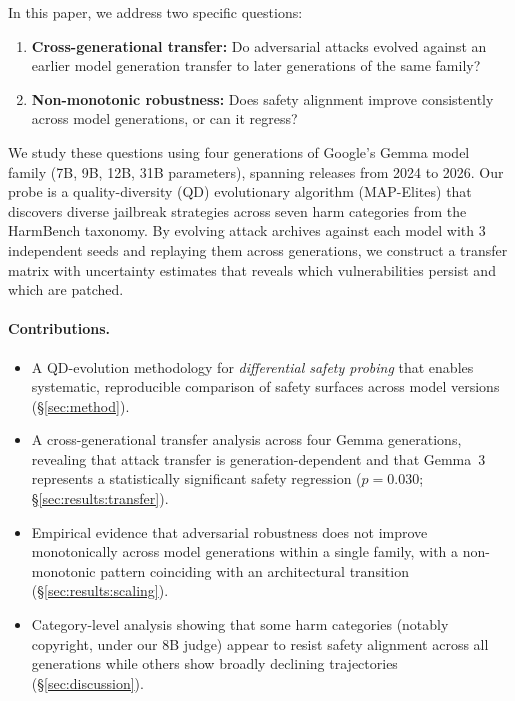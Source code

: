 \documentclass{article}
\begin{document}
In this paper, we address two specific questions:
\begin{enumerate}
    \item \textbf{Cross-generational transfer:} Do adversarial attacks
          evolved against an earlier model generation transfer to later
          generations of the same family?
    \item \textbf{Non-monotonic robustness:} Does safety alignment
          improve consistently across model generations, or can it
          regress?
\end{enumerate}

We study these questions using four generations of Google's Gemma model
family (7B, 9B, 12B, 31B parameters), spanning releases from 2024 to 2026.
Our probe is a quality-diversity (QD) evolutionary algorithm (MAP-Elites)
that discovers diverse jailbreak strategies across seven harm categories
from the HarmBench taxonomy. By evolving attack archives against each model
with 3 independent seeds and replaying them across generations, we
construct a transfer matrix with uncertainty estimates that reveals which
vulnerabilities persist and which are patched.

\paragraph{Contributions.}
\begin{itemize}
    \item A QD-evolution methodology for \emph{differential safety probing}
          that enables systematic, reproducible comparison of safety surfaces
          across model versions (\S\ref{sec:method}).
    \item A cross-generational transfer analysis across four Gemma
          generations, revealing that attack transfer is generation-dependent
          and that Gemma~3 represents a statistically significant safety
          regression ($p = 0.030$; \S\ref{sec:results:transfer}).
    \item Empirical evidence that adversarial robustness does not improve
          monotonically across model generations within a single family,
          with a non-monotonic pattern coinciding with an architectural
          transition
          (\S\ref{sec:results:scaling}).
    \item Category-level analysis showing that some harm categories
          (notably copyright, under our 8B judge) appear to resist
          safety alignment across all generations while others show
          broadly declining trajectories
          (\S\ref{sec:discussion}).
\end{itemize}
\end{document}

